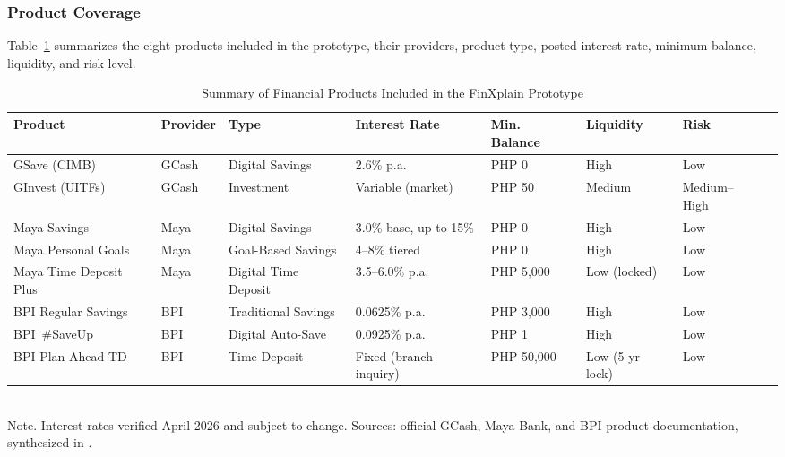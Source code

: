 \documentclass[journal]{./IEEE/IEEEtran}
\begin{document}
\subsubsection{Product Coverage}

Table~\ref{tab:products} summarizes the eight products included in the prototype, their providers, product type, posted interest rate, minimum balance, liquidity, and risk level.

\begin{table}[t]
    \centering
    \caption{Summary of Financial Products Included in the FinXplain Prototype}
    \label{tab:products}
    \small
    \begin{tabular}{|l|l|l|l|l|l|l|l|}
        \hline
        \textbf{Product} & \textbf{Provider} & \textbf{Type} & \textbf{Interest Rate} & \textbf{Min. Balance} & \textbf{Liquidity} & \textbf{Risk}\\
        \hline
        GSave (CIMB)             & GCash & Digital Savings        & 2.6\% p.a.                 & PHP 0      & High & Low         \\
        \hline
        GInvest (UITFs)          & GCash & Investment             & Variable (market)          & PHP 50     & Medium & Medium--High \\
        \hline
        Maya Savings             & Maya  & Digital Savings        & 3.0\% base, up to 15\%     & PHP 0      & High & Low         \\
        \hline
        Maya Personal Goals      & Maya  & Goal-Based Savings     & 4--8\% tiered              & PHP 0      & High & Low        \\
        \hline
        Maya Time Deposit Plus   & Maya  & Digital Time Deposit   & 3.5--6.0\% p.a.            & PHP 5,000  & Low (locked) & Low   \\
        \hline
        BPI Regular Savings      & BPI   & Traditional Savings    & 0.0625\% p.a.              & PHP 3,000  & High & Low         \\
        \hline
        BPI~\#SaveUp             & BPI   & Digital Auto-Save      & 0.0925\% p.a.              & PHP 1      & High & Low         \\
        \hline
        BPI Plan Ahead TD        & BPI   & Time Deposit           & Fixed (branch inquiry)     & PHP 50,000 & Low (5-yr lock) & Low\\
        \hline
    \end{tabular}
    \\[2pt]
    {\footnotesize Note. Interest rates verified April 2026 and subject to change. Sources: official GCash, Maya Bank, and BPI product documentation, synthesized in \cite{ref35}.}
\end{table}
\end{document}
